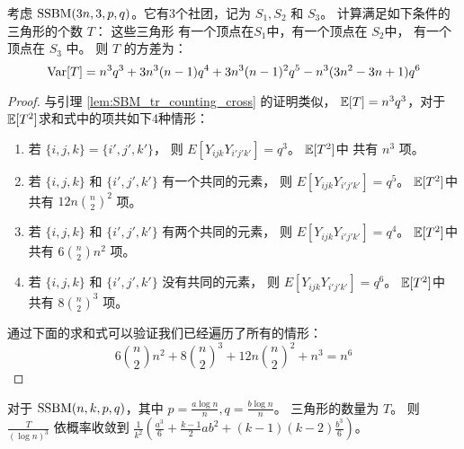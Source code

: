 \begin{lemma}\label{lem:SBM_tr_counting_3}
	考虑 $\operatorname{SSBM}(3n, 3, p, q)$。它有3个社团，记为
  $S_1,S_2$ 和 $S_3$。
  计算满足如下条件的三角形的个数 $T$：
  这些三角形 有一个顶点在$S_1$中，有一个顶点在 $S_2$中，
  有一个顶点在 $S_3$ 中。
	则 $T$ 的方差为：
	\begin{equation*}\label{eq:SBM_tr_counting_three}
	\operatorname{\mathrm{Var}}[T] = n^3 q^3  + 3n^3(n-1) q^4  + 3 n^3 (n-1)^2 q^5 - n^3(3n^2-3n+1)q^6
	\end{equation*}
\end{lemma}

\begin{proof}
	与引理 \ref{lem:SBM_tr_counting_cross} 的证明类似，
	$\operatorname{\mathbb{E}}[T] = n^3 q^3$，对于$\operatorname{\mathbb{E}}[T^2]$求和式中的项共如下4种情形：
	\begin{enumerate}
	\item 若 $\{i,j,k\} = \{i',j',k'\}$， 则 $E[Y_{ijk}Y_{i'j'k'}] = q^3$。
	$\operatorname{\mathbb{E}}[T^2]$中 共有 $n^3$ 项。
	\item 若 $\{i,j,k\}$ 和 $\{i',j',k'\}$ 有一个共同的元素， 则 $E[Y_{ijk}Y_{i'j'k'}] = q^5$。
	$\operatorname{\mathbb{E}}[T^2]$中 共有 $12n\binom{n}{2}^2$ 项。
	\item 若 $\{i,j,k\}$ 和 $\{i',j',k'\}$ 有两个共同的元素， 则 $E[Y_{ijk}Y_{i'j'k'}] = q^4$。
	$\operatorname{\mathbb{E}}[T^2]$中 共有 $6\binom{n}{2}n^2$ 项。
	\item 若 $\{i,j,k\}$ 和 $\{i',j',k'\}$ 没有共同的元素， 则  $E[Y_{ijk}Y_{i'j'k'}] = q^6$。
	$\operatorname{\mathbb{E}}[T^2]$中 共有 $8\binom{n}{2}^3$ 项。
\end{enumerate}	
通过下面的求和式可以验证我们已经遍历了所有的情形：
$$
6\binom{n}{2}n^2  + 8\binom{n}{2}^3 + 12n\binom{n}{2}^2 +  n^3 = n^6
$$
\end{proof}
\begin{lemma}\label{lem:sbmV}
 对于 $\operatorname{SSBM}(n, k, p, q)$，其中 $p=\frac{a\log n}{n}, q = \frac{b\log n}{n}$。
 三角形的数量为 $T$。
	则 $\frac{T}{(\log n)^3}$ 依概率收敛到 $\frac{1}{k^2}(\frac{a^3}{6} + \frac{k-1}{2}ab^2 + (k-1)(k-2)\frac{b^3}{6} )$。
\end{lemma}
